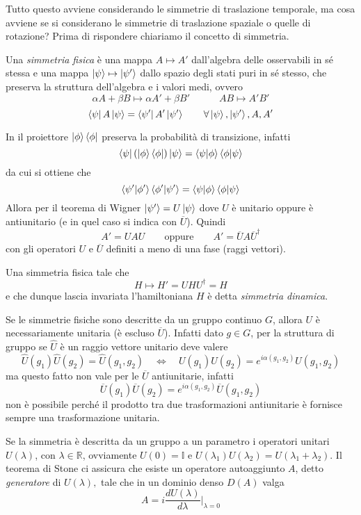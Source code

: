 \documentclass[../../FisicaTeorica.tex]{subfiles}
\begin{document}
Tutto questo avviene considerando le simmetrie di traslazione temporale, ma cosa avviene se si considerano le simmetrie di traslazione spaziale o quelle di rotazione? Prima di rispondere chiariamo il concetto di simmetria.

\begin{dfn}
Una \emph{simmetria fisica} è una mappa $A \mapsto A'$ dall'algebra delle osservabili in sé stessa e una mappa $\ket{\psi} \mapsto \ket{\psi'}$ dallo spazio degli stati puri in sé stesso, che preserva la struttura dell'algebra e i valori medi, ovvero
\[
\alpha A + \beta B \mapsto \alpha A' + \beta B' \quad \quad \quad A B \mapsto A' B'
\]
\[
\bra\psi A \ket\psi = \bra{\psi'} A' \ket{\psi'} \qquad \forall \ket\psi, \ket{\psi'}, A, A'
\]
\end{dfn}

In \MQ il proiettore $\ket\phi \bra\phi$ preserva la probabilità di transizione, infatti
\[
\bra\psi (\ket\phi \bra\phi) \ket\psi = \braket{\psi|\phi} \braket{\phi|\psi}
\]
da cui si ottiene che
\[
\braket{\psi'|\phi'} \braket{\phi'|\psi'} = \braket{\psi|\phi} \braket{\phi|\psi}
\]
Allora per il teorema di Wigner $\ket{\psi'} = U \ket\psi$ dove $U$ è unitario oppure è antiunitario (e in quel caso si indica con $\overline U$). Quindi
\[
A' = U A U \qquad \text{oppure} \qquad A' = \overline U A \overline U^\dag
\]
con gli operatori $U$ e $\overline U$ definiti a meno di una fase (raggi vettori).

\begin{dfn}
Una simmetria fisica tale che
\[
H \mapsto H' = U H U^\dag = H
\]
e che dunque lascia invariata l'hamiltoniana $H$ è detta \emph{simmetria dinamica}.
\end{dfn}

Se le simmetrie fisiche sono descritte da un gruppo continuo $G$, allora $U$ è necessariamente unitaria (è escluso $\overline U$). Infatti dato $g \in G$, per la struttura di gruppo se $\hat U$ è un raggio vettore unitario deve valere
\[
\hat U (g_1) \hat U (g_2) = \hat U (g_1, g_2) \quad \iff \quad U(g_1) U(g_2) = e^{i \alpha (g_1, g_2)} U(g_1, g_2)
\]
ma questo fatto non vale per le $\overline U$ antiunitarie, infatti
\[
\overline U(g_1) \overline U(g_2) = e^{i \alpha (g_1, g_2)} \overline U(g_1, g_2)
\]
non è possibile perché il prodotto tra due trasformazioni antiunitarie è fornisce sempre una trasformazione unitaria.

Se la simmetria è descritta da un gruppo a un parametro i operatori unitari $U(\lambda)$, con $\lambda \in \mathbb R$, ovviamente $U(0) = \mathbb{I}$ e $U(\lambda_1)U(\lambda_2) = U(\lambda_1 + \lambda_2)$. Il teorema di Stone ci assicura che esiste un operatore autoaggiunto $A$, detto \emph{generatore} di $U(\lambda),$ tale che in un dominio denso $D(A)$ valga
\[
A = i \frac{d U(\lambda)}{d \lambda}\bigg|_{\lambda = 0}
\]
\end{document}
